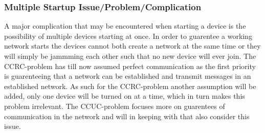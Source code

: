 \subsubsection*{Multiple Startup Issue/Problem/Complication}
A major complication that may be encountered when starting a device is the possibility of multiple devices starting at once.
In order to guarentee a working network starts the devices cannot both create a network at the same time or they will simply be jammming each other such that no new device will ever join.
The CCRC-problem has till now assumed perfect communication as the first priority is guarenteeing that a network can be established and transmit messages in an established network.
As such for the CCRC-problem another assumption will be added, only one device will be turned on at a time, which in turn makes this problem irrelevant.
The CCUC-problem focuses more on guarentees of communication in the network and will in keeping with that also consider this issue.